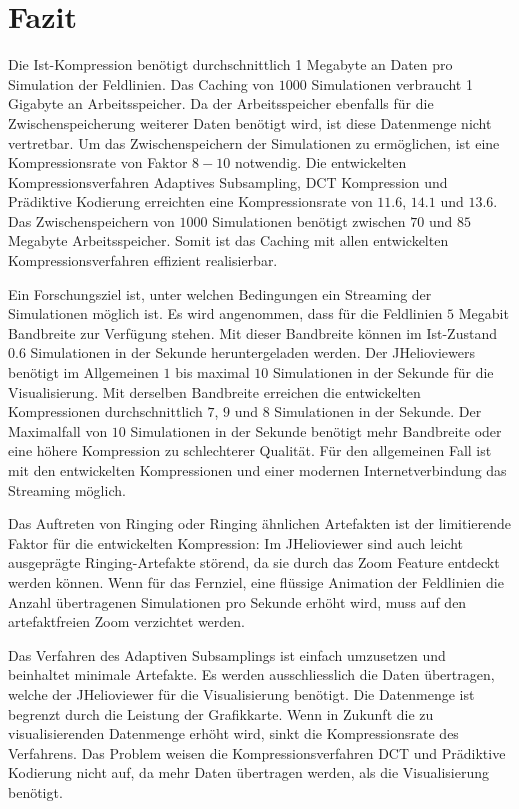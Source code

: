 \section{Fazit}
Die Ist-Kompression benötigt durchschnittlich 1 Megabyte an Daten pro Simulation der Feldlinien. Das Caching von $1000$ Simulationen verbraucht 1 Gigabyte an Arbeitsspeicher. Da der Arbeitsspeicher ebenfalls für die Zwischenspeicherung weiterer Daten benötigt wird, ist diese Datenmenge nicht vertretbar. Um das Zwischenspeichern der Simulationen zu ermöglichen, ist eine Kompressionsrate von Faktor $8-10$ notwendig. Die entwickelten Kompressionsverfahren Adaptives Subsampling, DCT Kompression und Prädiktive Kodierung erreichten eine Kompressionsrate von $11.6$, $14.1$ und $13.6$. Das Zwischenspeichern von $1000$ Simulationen benötigt zwischen $70$ und $85$ Megabyte Arbeitsspeicher. Somit ist das Caching mit allen entwickelten Kompressionsverfahren effizient realisierbar.

Ein Forschungsziel ist, unter welchen Bedingungen ein Streaming der Simulationen möglich ist. Es wird angenommen, dass für die Feldlinien $5$ Megabit Bandbreite zur Verfügung stehen. Mit dieser Bandbreite können im Ist-Zustand $0.6$ Simulationen in der Sekunde heruntergeladen werden. Der JHelioviewers benötigt im Allgemeinen $1$ bis maximal $10$ Simulationen in der Sekunde für die Visualisierung. Mit derselben Bandbreite erreichen die entwickelten Kompressionen durchschnittlich $7$, $9$ und $8$ Simulationen in der Sekunde. Der Maximalfall von $10$ Simulationen in der Sekunde benötigt mehr Bandbreite oder eine höhere Kompression zu schlechterer Qualität. Für den allgemeinen Fall ist mit den entwickelten Kompressionen und einer modernen Internetverbindung das Streaming möglich. 

Das Auftreten von Ringing oder Ringing ähnlichen Artefakten ist der limitierende Faktor für die entwickelten Kompression: Im JHelioviewer sind auch leicht ausgeprägte Ringing-Artefakte störend, da sie durch das Zoom Feature entdeckt werden können. Wenn für das Fernziel, eine flüssige Animation der Feldlinien die Anzahl übertragenen Simulationen pro Sekunde erhöht wird, muss auf den artefaktfreien Zoom verzichtet werden.

Das Verfahren des Adaptiven Subsamplings ist einfach umzusetzen und beinhaltet minimale Artefakte. Es werden ausschliesslich die Daten übertragen, welche der JHelioviewer für die Visualisierung benötigt. Die Datenmenge ist begrenzt durch die Leistung der Grafikkarte. Wenn in Zukunft die zu visualisierenden Datenmenge erhöht wird, sinkt die Kompressionsrate des Verfahrens. Das Problem weisen die Kompressionsverfahren DCT und Prädiktive Kodierung nicht auf, da mehr Daten übertragen werden, als die Visualisierung benötigt.

